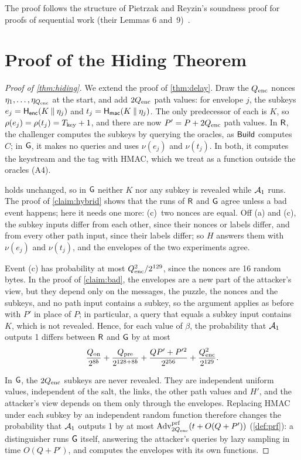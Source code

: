 The proof follows the structure of Pietrzak and Reyzin's soundness proof for proofs of sequential work (their Lemmas 6 and~9)~\cite{PR26}.

\section{Proof of the Hiding Theorem}\label{app:hiding}

\begin{proof}[Proof of \cref{thm:hiding}]
We extend the proof of \cref{thm:delay}. Draw the $Q_{\mathrm{enc}}$ nonces $\eta_1, \dots, \eta_{Q_{\mathrm{enc}}}$ at the start, and add $2Q_{\mathrm{enc}}$ path values: for envelope $j$, the subkeys $e_j = \mathsf{H}_{\mathsf{enc}}(K \mathbin{\|} \eta_j)$ and $t_j = \mathsf{H}_{\mathsf{mac}}(K \mathbin{\|} \eta_j)$. The only predecessor of each is $K$, so $\rho(e_j) = \rho(t_j) = T_{\mathrm{key}} + 1$, and there are now $P' = P + 2Q_{\mathrm{enc}}$ path values. In $\mathsf{R}$, the challenger computes the subkeys by querying the oracles, as $\mathsf{Build}$ computes $C$; in $\mathsf{G}$, it makes no queries and uses $\nu(e_j)$ and $\nu(t_j)$. In both, it computes the keystream and the tag with HMAC, which we treat as a function outside the oracles (A4).

 holds unchanged, so in $\mathsf{G}$ neither $K$ nor any subkey is revealed while $\mathcal{A}_1$ runs. The proof of \cref{claim:hybrid} shows that the runs of $\mathsf{R}$ and $\mathsf{G}$ agree unless a bad event happens; here it needs one more: (c)~two nonces are equal. Off (a) and (c), the subkey inputs differ from each other, since their nonces or labels differ, and from every other path input, since their labels differ; so $H$ answers them with $\nu(e_j)$ and $\nu(t_j)$, and the envelopes of the two experiments agree.

Event (c) has probability at most $Q_{\mathrm{enc}}^2/2^{129}$, since the nonces are 16 random bytes. In the proof of \cref{claim:bad}, the envelopes are a new part of the attacker's view, but they depend only on the messages, the puzzle, the nonces and the subkeys, and no path input contains a subkey, so the argument applies as before with $P'$ in place of $P$; in particular, a query that equals a subkey input contains $K$, which is not revealed. Hence, for each value of $\beta$, the probability that $\mathcal{A}_1$ outputs 1 differs between $\mathsf{R}$ and $\mathsf{G}$ by at most
\[
  \frac{Q_{\mathrm{on}}}{2^{8b}} + \frac{Q_{\mathrm{pre}}}{2^{128 + 8b}} + \frac{QP' + P'^2}{2^{256}} + \frac{Q_{\mathrm{enc}}^2}{2^{129}}.
\]

In $\mathsf{G}$, the $2Q_{\mathrm{enc}}$ subkeys are never revealed. They are independent uniform values, independent of the salt, the links, the other path values and $H'$, and the attacker's view depends on them only through the envelopes. Replacing HMAC under each subkey by an independent random function therefore changes the probability that $\mathcal{A}_1$ outputs 1 by at most $\mathrm{Adv}^{\mathrm{prf}}_{2Q_{\mathrm{enc}}}(t + O(Q + P'))$ (\cref{def:prf}): a distinguisher runs $\mathsf{G}$ itself, answering the attacker's queries by lazy sampling in time $O(Q + P')$, and computes the envelopes with its own functions.


\end{proof}
